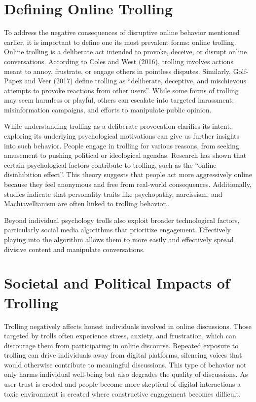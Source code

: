 \documentclass[twoside]{ctuthesis}
\theoremstyle{plain}
\theoremstyle{definition}
\theoremstyle{note}
\begin{document}
\section{Defining Online Trolling}
To address the negative consequences of disruptive online behavior mentioned earlier, it is important to define one its most prevalent forms: online trolling. Online trolling is a deliberate act intended to provoke, deceive, or disrupt online conversations. According to Coles and West (2016)\cite{Coles2016}, trolling involves actions meant to annoy, frustrate, or engage others in pointless disputes. Similarly, Golf-Papez and Veer (2017)\cite{GolfPapez2017DontFeedTheTroll} define trolling as ``deliberate, deceptive, and mischievous attempts to provoke reactions from other users''. While some forms of trolling may seem harmless or playful, others can escalate into targeted harassment, misinformation campaigns, and efforts to manipulate public opinion.\par

While understanding trolling as a deliberate provocation clarifies its intent, exploring its underlying psychological motivations can give us further insights into such behavior. People engage in trolling for various reasons, from seeking amusement to pushing political or ideological agendas. Research has shown that certain psychological factors contribute to trolling, such as the ``online disinhibition effect''. This theory suggests that people act more aggressively online because they feel anonymous and free from real-world consequences. \cite{Suler2004} Additionally, studies indicate that personality traits like psychopathy, narcissism, and Machiavellianism are often linked to trolling behavior.\cite{Buckels2014TrollsWantToHaveFun}.\par

Beyond individual psychology trolls also exploit broader technological factors, particularly social media algorithms that prioritize engagement. Effectively playing into the algorithm allows them to more easily and effectively spread divisive content and manipulate conversations.\cite{GolfPapez2017DontFeedTheTroll}

\section{Societal and Political Impacts of Trolling}
Trolling negatively affects honest individuals involved in online discussions. Those targeted by trolls often experience stress, anxiety, and frustration, which can discourage them from participating in online discourse. Repeated exposure to trolling can drive individuals away from digital platforms, silencing voices that would otherwise contribute to meaningful discussions. This type of behavior not only harms individual well-being but also degrades the quality of discussions. As user trust is eroded and people become more skeptical of digital interactions a toxic environment is created where constructive engagement becomes difficult.\cite{GolfPapez2017DontFeedTheTroll}\par
\end{document}
